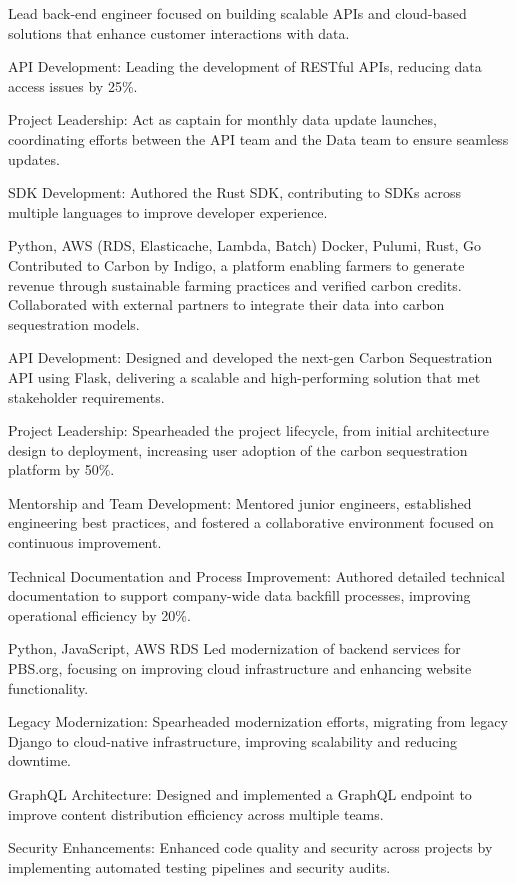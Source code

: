 \documentclass{ast_resume}
\begin{document}
{
  Lead back-end engineer focused on building scalable APIs and cloud-based solutions that enhance customer interactions with  data.
}
{
  \item API Development: Leading the development of RESTful APIs, reducing data access issues by 25\%.
  \item Project Leadership: Act as captain for monthly data update launches, coordinating efforts between the API team and the Data team to ensure seamless updates.
  \item SDK Development: Authored the Rust SDK, contributing to SDKs across multiple languages to improve developer experience.
}
{
  Python,
  AWS (RDS, Elasticache, Lambda, Batch)
  Docker,
  Pulumi,
  Rust,
  Go
}
\vspace{1em}
{
  Contributed to Carbon by Indigo, a platform enabling farmers to generate revenue through sustainable farming practices and verified carbon credits. Collaborated with external partners to integrate their data into carbon sequestration models.
}
{
  \item 
API Development: Designed and developed the next-gen Carbon Sequestration API using Flask, delivering a scalable and high-performing solution that met stakeholder requirements.
  \item Project Leadership: Spearheaded the project lifecycle, from initial architecture design to deployment, increasing user adoption of the carbon sequestration platform by 50\%.
  \item Mentorship and Team Development: Mentored junior engineers, established engineering best practices, and fostered a collaborative environment focused on continuous improvement.
  \item Technical Documentation and Process Improvement: Authored detailed technical documentation to support company-wide data backfill processes, improving operational efficiency by 20\%.
}
{
  Python,
  JavaScript,
  AWS RDS
}
\vspace{1em}
{
  Led modernization of backend services for PBS.org, focusing on improving cloud infrastructure and enhancing website functionality.
}
{
  \item Legacy Modernization: Spearheaded modernization efforts, migrating from legacy Django to cloud-native infrastructure, improving scalability and reducing downtime.
  \item GraphQL Architecture: Designed and implemented a GraphQL endpoint to improve content distribution efficiency across multiple teams.
  \item Security Enhancements: Enhanced code quality and security across projects by implementing automated testing pipelines and security audits.
}
\end{document}
